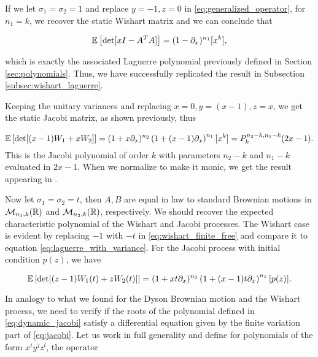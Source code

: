     If we let $\sigma_1 = \sigma_2 = 1$ and replace $y=-1, z=0$ in \eqref{eq:generalized_operator}, for $n_1 = k$, we recover the static Wishart matrix and we can conclude that

    \begin{equation} \label{eq:wishart_finite_free}
        \mathbb E \left[ \det[xI - A^TA] \right] = (1 - \partial_x)^{n_1}[x^k],
    \end{equation}

    \noindent which is exactly the associated Laguerre polynomial previously defined in Section \ref{sec:polynomials}. Thus, we have successfully replicated the result in Subsection \ref{subsec:wishart_laguerre}.

    Keeping the unitary variances and replacing $x=0, y=(x-1), z=x$, we get the static Jacobi matrix, as shown previously, thus 

    \begin{equation*}
        \mathbb E \left[ \det[(x-1)W_1 + xW_2] \right] = (1+x\partial_x)^{n_2} \left(1 + (x-1)\partial_x\right)^{n_1}[x^k] = P_k^{n_2 - k, n_1-k}(2x-1).
    \end{equation*}
    This is the Jacobi polynomial of order $k$ with parameters $n_2 - k$ and $n_1-k$ evaluated in $2x-1$. When we normalize to make it monic, we get the result appearing in \cite{edelman1988eigenvalues}.

    Now let $\sigma_1= \sigma_2 = t$, then $A,B$ are equal in law to standard Brownian motions in $\mathcal M_{n_1,k}(\mathbb R)$ and $\mathcal M_{n_2,k}(\mathbb R)$, respectively. We should recover the expected characteristic polynomial of the Wishart and Jacobi processes. The Wishart case is evident by replacing $-1$ with $-t$ in \eqref{eq:wishart_finite_free} and compare it to equation \eqref{eq:laguerre_with_variance}. For the Jacobi process with initial condition $p(z)$, we have

    \begin{equation} \label{eq:dynamic_jacobi}
        \mathbb E \left[ \det[(z-1)W_1(t) + zW_2(t)] \right] = (1+xt\partial_x)^{n_2} \left(1 + (x-1)t\partial_x\right)^{n_1}[p(z)].
    \end{equation}

    In analogy to what we found for the Dyson Brownian motion and the Wishart process, we need to verify if the roots of the polynomial defined in \eqref{eq:dynamic_jacobi} satisfy a differential equation given by the finite variation part of \eqref{eq:jacobi}. Let us work in full generality and define for polynomials of the form $x^i y^j z^l$, the operator


